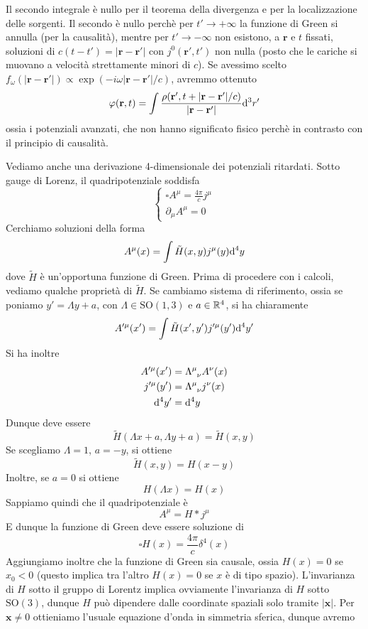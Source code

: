\documentclass{article}
\renewcommand{\vec}[1]{\mathbf{#1}}
\begin{document}
\begin{enumerate}
	Il secondo integrale è nullo per il teorema della divergenza e per la localizzazione delle sorgenti. Il secondo è nullo perchè per $t'\to+\infty$ la funzione di Green si annulla (per la causalità), mentre per $t'\to-\infty$ non esistono, a $\vec{r}$ e $t$ fissati, soluzioni di $c(t-t')=|\vec{r}-\vec{r}'|$ con $j^0(\vec{r}',t')$ non nulla (posto che le cariche si muovano a velocità strettamente minori di $c$). Se avessimo scelto $f_\omega(|\vec{r}-\vec{r}'|)\propto\exp(-i\omega|\vec{r}-\vec{r}'|/c)$, avremmo ottenuto
	\[\varphi(\vec{r},t)=\int\frac{\rho(\vec{r}',t+|\vec{r}-\vec{r}'|/c)}{|\vec{r}-\vec{r}'|}\d ^3r'\]
	ossia i potenziali avanzati, che non hanno significato fisico perchè in contrasto con il principio di causalità.
	
	\noindent Vediamo anche una derivazione 4-dimensionale dei potenziali ritardati. Sotto gauge di Lorenz, il quadripotenziale soddisfa
	\[\begin{cases}
	\square A^\mu=\frac{4\pi}{c}j^\mu\\\partial_\mu A^\mu=0
	\end{cases}\]
	Cerchiamo soluzioni della forma
	\[A^\mu(x)=\int \tilde{H}(x,y)j^\mu(y)\mathrm{d} ^4y\]
	dove $\tilde{H}$ è un'opportuna funzione di Green. Prima di procedere con i calcoli, vediamo qualche proprietà di $\tilde{H}$. Se cambiamo sistema di riferimento, ossia se poniamo $y'=\Lambda y+a$, con $\Lambda\in\mathrm{SO}(1,3)$ e $a\in\mathbb{R}^4$, si ha chiaramente
	\[A'^\mu(x')=\int\tilde{H}(x',y')j'^\mu(y')\mathrm{d}^4y'\]
	Si ha inoltre
	\begin{align*}
		A'^\mu(x')&=\tensor{\Lambda}{^\mu_\nu}A^\nu(x)\\
		j'^\mu(y')&=\tensor{\Lambda}{^\mu_\nu}j^\nu(x)\\
		\d ^4y'&=\d ^4y
	\end{align*}
	Dunque deve essere
	\[\tilde{H}(\Lambda x+a,\Lambda y+a)=\tilde{H}(x,y)\]
	Se scegliamo $\Lambda=1$, $a=-y$, si ottiene
	\[\tilde{H}(x,y)=H(x-y)\]
	Inoltre, se $a=0$ si ottiene
	\[H(\Lambda x)=H(x)\]
	Sappiamo quindi che il quadripotenziale è 
	\[A^\mu=H*j^\mu\]
	E dunque la funzione di Green deve essere soluzione di
	\[\square H(x)=\frac{4\pi}{c}\delta^4(x)\]
Aggiungiamo inoltre che la funzione di Green sia causale, ossia $H(x)=0$ se $x_0<0$ (questo implica tra l'altro $H(x)=0$ se $x$ è di tipo spazio). L'invarianza di $H$ sotto il gruppo di Lorentz implica ovviamente l'invarianza di $H$ sotto $\mathrm{SO}(3)$, dunque $H$ può dipendere dalle coordinate spaziali solo tramite $|\vec{x}|$. Per $\vec{x}\neq0$ ottieniamo l'usuale equazione d'onda in simmetria sferica, dunque avremo

\end{enumerate}
\end{document}
